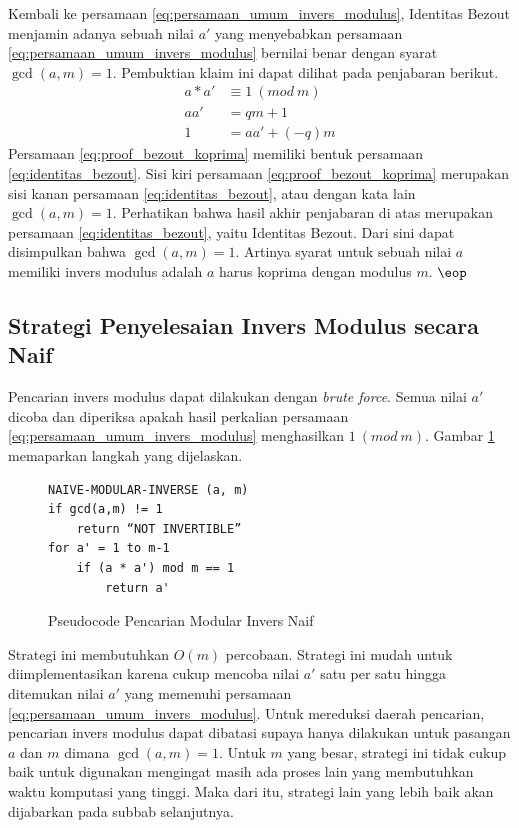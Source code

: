 Kembali ke persamaan \eqref{eq:persamaan_umum_invers_modulus}, Identitas Bezout menjamin adanya sebuah nilai $ a' $ yang menyebabkan persamaan \eqref{eq:persamaan_umum_invers_modulus} bernilai benar dengan syarat $ \gcd (a,m) = 1 $. Pembuktian klaim ini dapat dilihat pada penjabaran berikut.
\begin{align}
a * a' &\equiv 1\ (mod\ m) \\
aa' &= qm + 1 \\
1 &= aa' + (-q)m
\label{eq:proof_bezout_koprima}
\end{align}
Persamaan \eqref{eq:proof_bezout_koprima} memiliki bentuk persamaan \eqref{eq:identitas_bezout}. Sisi kiri persamaan \eqref{eq:proof_bezout_koprima} merupakan sisi kanan persamaan \eqref{eq:identitas_bezout}, atau dengan kata lain $ \gcd (a, m) = 1 $. Perhatikan bahwa hasil akhir penjabaran di atas merupakan persamaan \eqref{eq:identitas_bezout}, yaitu Identitas Bezout. Dari sini dapat disimpulkan bahwa $ \gcd (a, m)=1 $. Artinya syarat untuk sebuah nilai $ a $ memiliki invers modulus adalah $ a $ harus koprima dengan modulus $ m $. \hfill $ \eop $

\subsection{Strategi Penyelesaian Invers Modulus secara Naif}

Pencarian invers modulus dapat dilakukan dengan \textit{brute force}. Semua nilai $ a' $ dicoba dan diperiksa apakah hasil perkalian persamaan \eqref{eq:persamaan_umum_invers_modulus} menghasilkan $ 1\ (mod\ m) $. Gambar \ref{psdo:modinv_naive} memaparkan langkah yang dijelaskan.
\begin{figure}[h!]
\begin{lstlisting}[firstnumber=0]
NAIVE-MODULAR-INVERSE (a, m)
if gcd(a,m) != 1
	return “NOT INVERTIBLE”
for a' = 1 to m-1
	if (a * a') mod m == 1
		return a'
\end{lstlisting}
\caption{Pseudocode Pencarian Modular Invers Naif}
\label{psdo:modinv_naive}
\end{figure}

Strategi ini membutuhkan $ O(m) $ percobaan. Strategi ini mudah untuk diimplementasikan karena cukup mencoba nilai $ a' $ satu per satu hingga ditemukan nilai $ a' $ yang memenuhi persamaan \eqref{eq:persamaan_umum_invers_modulus}. Untuk mereduksi daerah pencarian, pencarian invers modulus dapat dibatasi supaya hanya dilakukan untuk pasangan $ a $ dan $ m $ dimana $ \gcd⁡(a, m)= 1 $. Untuk $ m $ yang besar, strategi ini tidak cukup baik untuk digunakan mengingat masih ada proses lain yang membutuhkan waktu komputasi yang tinggi. Maka dari itu, strategi lain yang lebih baik akan dijabarkan pada subbab selanjutnya.

